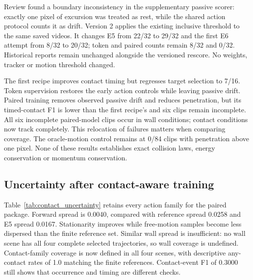 \documentclass[11pt,a4paper]{article}
\begin{document}
Review found a boundary inconsistency in the supplementary passive scorer: exactly one pixel of excursion was treated as rest, while the shared action protocol counts it as drift. Version 2 applies the existing inclusive threshold to the same saved videos. It changes E5 from 22/32 to 29/32 and the first E6 attempt from 8/32 to 20/32; token and paired counts remain 8/32 and 0/32. Historical reports remain unchanged alongside the versioned rescore. No weights, tracker or motion threshold changed.

The first recipe improves contact timing but regresses target selection to 7/16. Token supervision restores the early action controls while leaving passive drift. Paired training removes observed passive drift and reduces penetration, but its timed-contact F1 is lower than the first recipe's and six clips remain incomplete. All six incomplete paired-model clips occur in wall conditions; contact conditions now track completely. This relocation of failures matters when comparing coverage. The oracle-motion control remains at 0/84 clips with penetration above one pixel. None of these results establishes exact collision laws, energy conservation or momentum conservation.

\clearpage
\subsection{Uncertainty after contact-aware training}
Table~\ref{tab:contact_uncertainty} retains every action family for the paired package. Forward spread is 0.0040, compared with reference spread 0.0258 and E5 spread 0.0167. Stationarity improves while free-motion samples become less dispersed than the finite reference set. Similar wall spread is insufficient: no wall scene has all four complete selected trajectories, so wall coverage is undefined. Contact-family coverage is now defined in all four scenes, with descriptive any-contact rates of 1.0 matching the finite references. Contact-event F1 of 0.3000 still shows that occurrence and timing are different checks.
\end{document}

